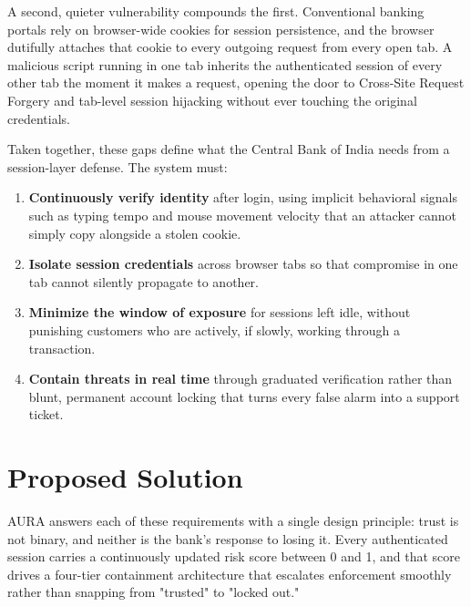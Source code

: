 \documentclass[11pt,journal,onecolumn]{article}
\begin{document}
A second, quieter vulnerability compounds the first. Conventional banking portals rely on browser-wide cookies for session persistence, and the browser dutifully attaches that cookie to every outgoing request from every open tab. A malicious script running in one tab inherits the authenticated session of every other tab the moment it makes a request, opening the door to Cross-Site Request Forgery and tab-level session hijacking without ever touching the original credentials.

Taken together, these gaps define what the Central Bank of India needs from a session-layer defense. The system must:
\begin{enumerate}
    \item \textbf{Continuously verify identity} after login, using implicit behavioral signals such as typing tempo and mouse movement velocity that an attacker cannot simply copy alongside a stolen cookie.
    \item \textbf{Isolate session credentials} across browser tabs so that compromise in one tab cannot silently propagate to another.
    \item \textbf{Minimize the window of exposure} for sessions left idle, without punishing customers who are actively, if slowly, working through a transaction.
    \item \textbf{Contain threats in real time} through graduated verification rather than blunt, permanent account locking that turns every false alarm into a support ticket.
\end{enumerate}

\section{Proposed Solution}
AURA answers each of these requirements with a single design principle: trust is not binary, and neither is the bank's response to losing it. Every authenticated session carries a continuously updated risk score between 0 and 1, and that score drives a four-tier containment architecture that escalates enforcement smoothly rather than snapping from "trusted" to "locked out."
\end{document}
